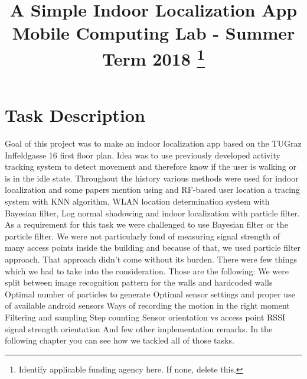 \documentclass[conference]{IEEEtran}
\begin{document}
\title{A Simple Indoor Localization App\\
{\large Mobile Computing Lab - Summer Term 2018}
\thanks{Identify applicable funding agency here. If none, delete this.}
}

\author{
\and
{}
}

\maketitle


\section{Task Description}
Goal of this project was to make an indoor localization app based on the TUGraz Inffeldgasse 16 first floor plan. Idea was to use previously developed activity tracking system to detect movement and therefore know if the user is walking or is in the idle state. Throughout the history various methods were used for indoor localization and some papers mention using and RF-based user location a tracing system with KNN algorithm, WLAN location determination system with Bayesian filter, Log normal shadowing and indoor localization with particle filter. As a requirement for this task we were challenged to use Bayesian filter or the particle filter. We were not particularly fond of measuring signal strength of many access points inside the building and because of that, we used particle filter approach. That approach didn’t come without its burden. There were few things which we had to take into the consideration. Those are the following:
We were split between image recognition pattern for the walls and hardcoded walls
Optimal number of particles to generate
Optimal sensor settings and proper use of available android sensors
Ways of recording the motion in the right moment 
Filtering and sampling
Step counting
Sensor orientation vs access point RSSI signal strength orientation
And few other implementation remarks. In the following chapter you can see how we tackled all of those tasks.
\end{document}
